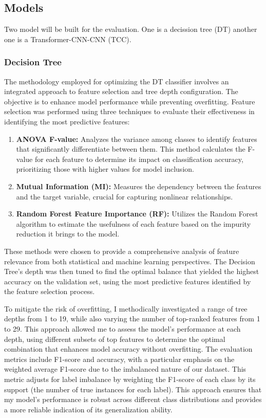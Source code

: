\subsection{Models}
Two model will be built for the evaluation. One is a decission tree (DT) another one is a Transformer-CNN-CNN (TCC)\cite{yin2023depression}.

\subsubsection{Decision Tree}

The methodology employed for optimizing the DT classifier involves an integrated approach to feature selection and tree depth configuration. The objective is to enhance model performance while preventing overfitting. Feature selection was performed using three techniques to evaluate their effectiveness in identifying the most predictive features:

\begin{enumerate}
    \item \textbf{ANOVA F-value:} Analyzes the variance among classes to identify features that significantly differentiate between them. This method calculates the F-value for each feature to determine its impact on classification accuracy, prioritizing those with higher values for model inclusion.
    \item \textbf{Mutual Information (MI):} Measures the dependency between the features and the target variable, crucial for capturing nonlinear relationships.
    \item \textbf{Random Forest Feature Importance (RF):} Utilizes the Random Forest algorithm to estimate the usefulness of each feature based on the impurity reduction it brings to the model.
\end{enumerate}

These methods were chosen to provide a comprehensive analysis of feature relevance from both statistical and machine learning perspectives. The Decision Tree's depth was then tuned to find the optimal balance that yielded the highest accuracy on the validation set, using the most predictive features identified by the feature selection process.

To mitigate the risk of overfitting, I methodically investigated a range of tree depths from 1 to 19, while also varying the number of top-ranked features from 1 to 29. This approach allowed me to assess the model’s performance at each depth, using different subsets of top features to determine the optimal combination that enhances model accuracy without overfitting. The evaluation metrics include F1-score \cite{gfg_f1score} and accuracy, with a particular emphasis on the weighted average F1-score due to the imbalanced nature of our dataset. This metric adjusts for label imbalance by weighting the F1-score of each class by its support (the number of true instances for each label). This approach ensures that my model's performance is robust across different class distributions and provides a more reliable indication of its generalization ability.

